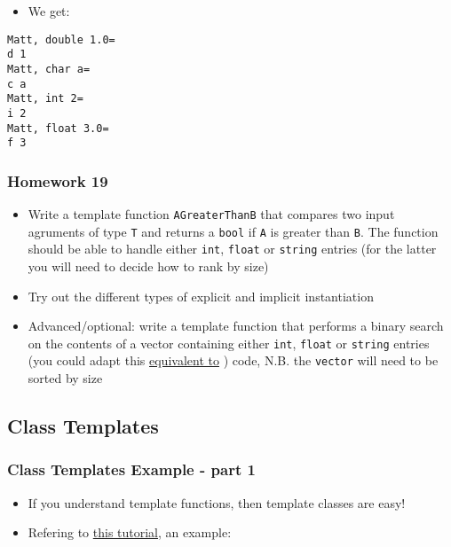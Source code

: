 \begin{itemize}
\itemsep1pt\parskip0pt
\item
  We get:
\end{itemize}

\begin{verbatim}
Matt, double 1.0=
d 1
Matt, char a=
c a
Matt, int 2=
i 2
Matt, float 3.0=
f 3
\end{verbatim}

\subsubsection{Homework 19}\label{homework-19-1}

\begin{itemize}
\itemsep1pt\parskip0pt
\item
  Write a template function \texttt{AGreaterThanB} that compares two
  input agruments of type \texttt{T} and returns a \texttt{bool} if
  \texttt{A} is greater than \texttt{B}. The function should be able to
  handle either \texttt{int}, \texttt{float} or \texttt{string} entries
  (for the latter you will need to decide how to rank by size)
\item
  Try out the different types of explicit and implicit instantiation
\item
  Advanced/optional: write a template function that performs a binary
  search on the contents of a vector containing either \texttt{int},
  \texttt{float} or \texttt{string} entries (you could adapt this
  \href{http://www.cplusplus.com/reference/algorithm/find/}{equivalent
  to} ) code, N.B. the \texttt{vector} will need to be sorted by size
\end{itemize}

\subsection{Class Templates}\label{class-templates}

\subsubsection{Class Templates Example - part
1}\label{class-templates-example---part-1}

\begin{itemize}
\itemsep1pt\parskip0pt
\item
  If you understand template functions, then template classes are easy!
\item
  Refering to
  \href{http://www.cplusplus.com/doc/tutorial/templates/}{this
  tutorial}, an example:
\end{itemize}

